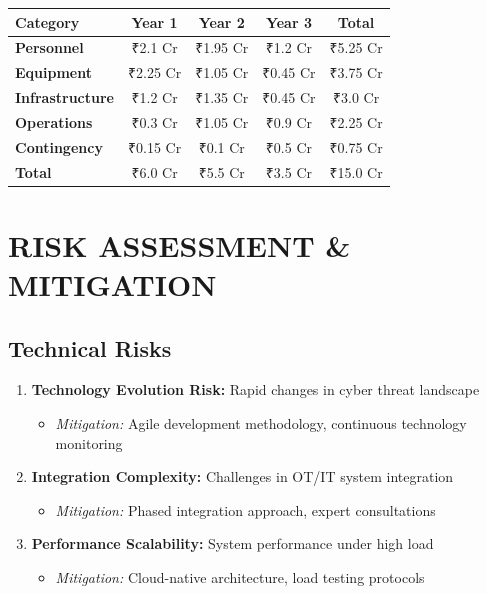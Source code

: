 \documentclass[12pt,a4paper]{article}
\begin{document}
\begin{longtable}{|l|c|c|c|c|}
\hline
\rowcolor{lightblue}
\textbf{Category} & \textbf{Year 1} & \textbf{Year 2} & \textbf{Year 3} & \textbf{Total} \\
\hline
\textbf{Personnel} & ₹2.1 Cr & ₹1.95 Cr & ₹1.2 Cr & ₹5.25 Cr \\
\hline
\textbf{Equipment} & ₹2.25 Cr & ₹1.05 Cr & ₹0.45 Cr & ₹3.75 Cr \\
\hline
\textbf{Infrastructure} & ₹1.2 Cr & ₹1.35 Cr & ₹0.45 Cr & ₹3.0 Cr \\
\hline
\textbf{Operations} & ₹0.3 Cr & ₹1.05 Cr & ₹0.9 Cr & ₹2.25 Cr \\
\hline
\textbf{Contingency} & ₹0.15 Cr & ₹0.1 Cr & ₹0.5 Cr & ₹0.75 Cr \\
\hline
\textbf{Total} & ₹6.0 Cr & ₹5.5 Cr & ₹3.5 Cr & ₹15.0 Cr \\
\hline
\end{longtable}

\section{RISK ASSESSMENT \& MITIGATION}

\subsection{Technical Risks}
\begin{enumerate}
\item \textbf{Technology Evolution Risk:} Rapid changes in cyber threat landscape
   \begin{itemize}
   \item \textit{Mitigation:} Agile development methodology, continuous technology monitoring
   \end{itemize}

\item \textbf{Integration Complexity:} Challenges in OT/IT system integration
   \begin{itemize}
   \item \textit{Mitigation:} Phased integration approach, expert consultations
   \end{itemize}

\item \textbf{Performance Scalability:} System performance under high load
   \begin{itemize}
   \item \textit{Mitigation:} Cloud-native architecture, load testing protocols
   \end{itemize}
\end{enumerate}
\end{document}
